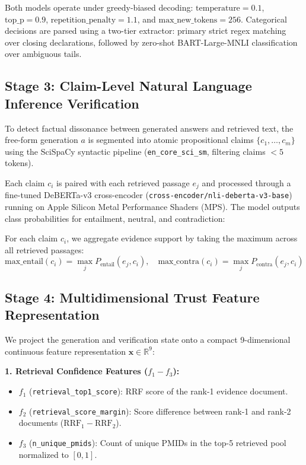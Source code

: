 \documentclass[journal,10pt]{IEEEtran}
\begin{document}
Both models operate under greedy-biased decoding: $\text{temperature} = 0.1$, $\text{top\_p} = 0.9$, $\text{repetition\_penalty} = 1.1$, and $\text{max\_new\_tokens} = 256$. Categorical decisions are parsed using a two-tier extractor: primary strict regex matching over closing declarations, followed by zero-shot BART-Large-MNLI classification over ambiguous tails.

\subsection{Stage 3: Claim-Level Natural Language Inference Verification}
To detect factual dissonance between generated answers and retrieved text, the free-form generation $a$ is segmented into atomic propositional claims $\{c_1, \dots, c_m\}$ using the SciSpaCy syntactic pipeline (\texttt{en\_core\_sci\_sm}, filtering claims $< 5$ tokens).

Each claim $c_i$ is paired with each retrieved passage $e_j$ and processed through a fine-tuned DeBERTa-v3 cross-encoder (\texttt{cross-encoder/nli-deberta-v3-base}) running on Apple Silicon Metal Performance Shaders (MPS). The model outputs class probabilities for entailment, neutral, and contradiction:
\begin{equation}
[P_{\text{entail}}(e_j, c_i), \, P_{\text{neutral}}(e_j, c_i), \, P_{\text{contra}}(e_j, c_i)]
\end{equation}

For each claim $c_i$, we aggregate evidence support by taking the maximum across all retrieved passages:
\begin{equation}
\text{max\_entail}(c_i) = \max_{j} P_{\text{entail}}(e_j, c_i), \quad \text{max\_contra}(c_i) = \max_{j} P_{\text{contra}}(e_j, c_i)
\end{equation}

\subsection{Stage 4: Multidimensional Trust Feature Representation}
We project the generation and verification state onto a compact 9-dimensional continuous feature representation $\mathbf{x} \in \mathbb{R}^9$:

\textbf{1. Retrieval Confidence Features ($f_1 - f_3$):}
\begin{itemize}
    \item $f_1$ (\texttt{retrieval\_top1\_score}): RRF score of the rank-1 evidence document.
    \item $f_2$ (\texttt{retrieval\_score\_margin}): Score difference between rank-1 and rank-2 documents ($\text{RRF}_1 - \text{RRF}_2$).
    \item $f_3$ (\texttt{n\_unique\_pmids}): Count of unique PMIDs in the top-5 retrieved pool normalized to $[0, 1]$.
\end{itemize}
\end{document}
